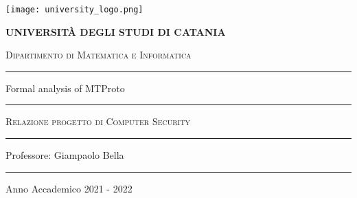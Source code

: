 \begin{titlepage}
    \centering
    \texttt{[image: university\_logo.png]}

    \bigskip

    {\Large \textbf{UNIVERSITÀ DEGLI STUDI DI CATANIA}}

    {\scshape
        \large
        Dipartimento di Matematica e Informatica
    }

    \bigskip

    \hrule

    \bigskip
    \bigskip
    \bigskip
    \bigskip

    {\itshape
        \large
        \@author
        \par}

    \bigskip
    \bigskip
    \bigskip
    \bigskip

    {\centering
        \Large
        \@title
        \par}
    \vspace{5mm}
    {\centering
        Formal analysis of MTProto
        \par}

    \bigskip
    \bigskip
    \bigskip
    \bigskip
    \bigskip
    \bigskip

    \begin{minipage}[b]{8 cm}
        \hrule
        \bigskip
        {\centering\scshape
            Relazione progetto di Computer Security
            \par}
        \bigskip
        \hrule
    \end{minipage}

    \bigskip
    \bigskip
    \bigskip
    \bigskip
    \bigskip
    \bigskip
    \bigskip
    \bigskip
    \bigskip
    \bigskip
    \bigskip

    {\raggedleft
        Professore: Giampaolo Bella
        \par}

    \bigskip
    \bigskip
    \bigskip
    \bigskip

    \vfill

    \hrule

    \bigskip

    {\centering
        Anno Accademico 2021 - 2022
        \par}

\end{titlepage}